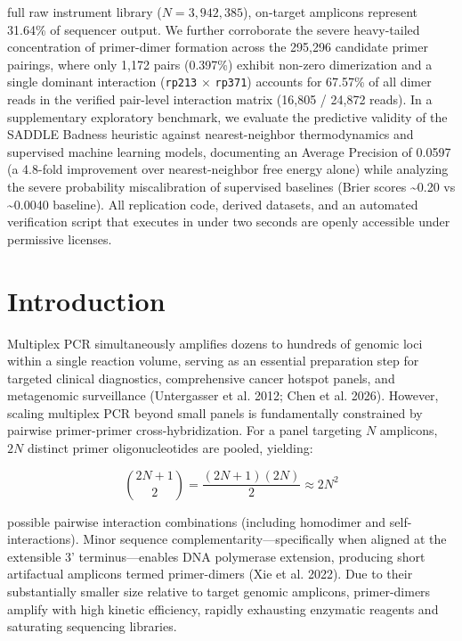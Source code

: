 \documentclass[
]{article}
\begin{document}
full raw instrument library (\(N = 3,942,385\)), on-target amplicons
represent 31.64\% of sequencer output. We further corroborate the severe
heavy-tailed concentration of primer-dimer formation across the 295,296
candidate primer pairings, where only 1,172 pairs (0.397\%) exhibit
non-zero dimerization and a single dominant interaction (\texttt{rp213}
\(\times\) \texttt{rp371}) accounts for 67.57\% of all dimer reads in
the verified pair-level interaction matrix (16,805 / 24,872 reads). In a
supplementary exploratory benchmark, we evaluate the predictive validity
of the SADDLE Badness heuristic against nearest-neighbor thermodynamics
and supervised machine learning models, documenting an Average Precision
of 0.0597 (a 4.8-fold improvement over nearest-neighbor free energy
alone) while analyzing the severe probability miscalibration of
supervised baselines (Brier scores \textasciitilde0.20 vs
\textasciitilde0.0040 baseline). All replication code, derived datasets,
and an automated verification script that executes in under two seconds
are openly accessible under permissive licenses.

\section{Introduction}\label{introduction}

Multiplex PCR simultaneously amplifies dozens to hundreds of genomic
loci within a single reaction volume, serving as an essential
preparation step for targeted clinical diagnostics, comprehensive cancer
hotspot panels, and metagenomic surveillance (Untergasser et al. 2012;
Chen et al. 2026). However, scaling multiplex PCR beyond small panels is
fundamentally constrained by pairwise primer-primer cross-hybridization.
For a panel targeting \(N\) amplicons, \(2N\) distinct primer
oligonucleotides are pooled, yielding:

\[\binom{2N+1}{2} = \frac{(2N+1)(2N)}{2} \approx 2N^2\]

possible pairwise interaction combinations (including homodimer and
self-interactions). Minor sequence complementarity---specifically when
aligned at the extensible 3' terminus---enables DNA polymerase
extension, producing short artifactual amplicons termed primer-dimers
(Xie et al. 2022). Due to their substantially smaller size relative to
target genomic amplicons, primer-dimers amplify with high kinetic
efficiency, rapidly exhausting enzymatic reagents and saturating
sequencing libraries.
\end{document}
